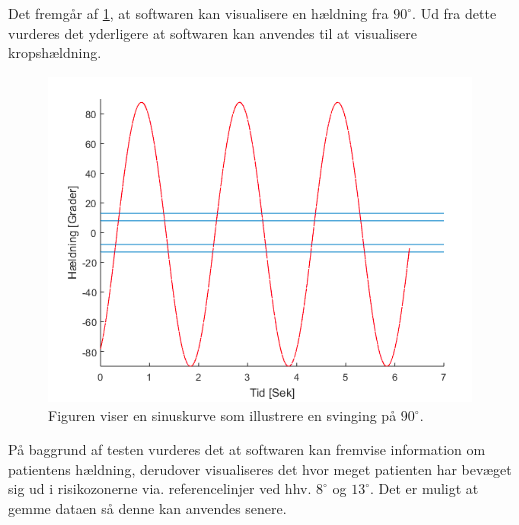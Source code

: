 Det fremgår af \ref{Fig:software_sinus}, at softwaren kan visualisere en hældning fra \pm$90^{\circ}$. Ud fra dette vurderes det yderligere at softwaren kan anvendes til at visualisere kropshældning. 

\begin{figure}[H] 
	\centering 
	\includegraphics[scale=0.5]{figures/cProblemloesning/sinus.PNG}
	\caption{Figuren viser en sinuskurve som illustrere en svinging på \pm $90^{\circ}$.}
	\label{Fig:software_sinus}
\end{figure}

På baggrund af testen vurderes det at softwaren kan fremvise information om patientens hældning, derudover visualiseres det hvor meget patienten har bevæget sig ud i risikozonerne via. referencelinjer ved hhv. \pm $8^{\circ}$ og \pm $13^{\circ}$. Det er muligt at gemme dataen så denne kan anvendes senere. 





